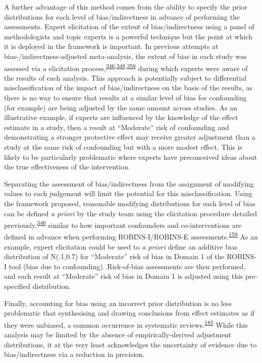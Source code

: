 \documentclass[a4paper, twoside]{templates/ociamthesis}
\begin{document}
A further advantage of this method comes from the ability to specify the prior distributions for each level of bias/indirectness in advance of performing the assessments. Expert elicitation of the extent of bias/indirectness using a panel of methodologists and topic experts is a powerful technique but the point at which it is deployed in the framework is important. In previous attempts at bias-/indirectness-adjusted meta-analysis, the extent of bias in each study was assessed via a elicitation process,\textsuperscript{\protect\hyperlink{ref-turner2009}{346},\protect\hyperlink{ref-thompson2011}{348},\protect\hyperlink{ref-wilks2011}{358}} during which experts were aware of the results of each analysis. This approach is potentially subject to differential misclassification of the impact of bias/indirectness on the basis of the results, as there is no way to ensure that results at a similar level of bias for confounding (for example) are being adjusted by the same amount across studies. As an illustrative example, if experts are influenced by the knowledge of the effect estimate in a study, then a result at ``Moderate'' risk of confounding and demonstrating a stronger protective effect may receive greater adjustment than a study at the same risk of confounding but with a more modest effect. This is likely to be particularly problematic where experts have preconceived ideas about the true effectiveness of the intervention.

Separating the assessment of bias/indirectness from the assignment of modifying values to each judgement will limit the potential for this misclassification. Using the framework proposed, reasonable modifying distributions for each level of bias can be defined \emph{a priori} by the study team using the elicitation procedure detailed previously,\textsuperscript{\protect\hyperlink{ref-turner2009}{346}} similar to how important confounders and co-interventions are defined in advance when performing ROBINS-I/ROBINS-E assessments.\textsuperscript{\protect\hyperlink{ref-sterne2016}{159}} As an example, expert elicitation could be used to \emph{a priori} define an additive bias distribution of N(.1,0.7) for ``Moderate'' risk of bias in Domain 1 of the ROBINS-I tool (bias due to confounding). Risk-of-bias assessments are then performed, and each result at ``Moderate'' risk of bias in Domain 1 is adjusted using this pre-specified distribution.

Finally, accounting for bias using an incorrect prior distribution is no less problematic that synthesising and drawing conclusions from effect estimates as if they were unbiased, a common occurrence in systematic reviews.\textsuperscript{\protect\hyperlink{ref-katikireddi2015}{185}} While this analysis may be limited by the absence of empirically-derived adjustment distributions, it at the very least acknowledges the uncertainty of evidence due to bias/indirectness via a reduction in precision.
\end{document}
